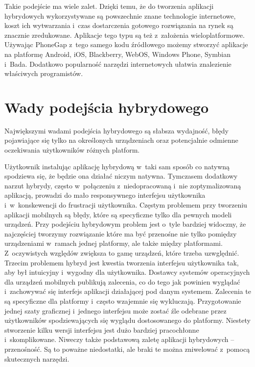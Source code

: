 \documentclass[brudnopis]{xmgr}
\begin{document}
Takie podejście ma wiele zalet. Dzięki temu, że do tworzenia aplikacji hybrydowych wykorzystywane są powszechnie znane technologie internetowe, koszt ich wytwarzania i~czas dostarczenia
gotowego rozwiązania na rynek są znacznie zredukowane. Aplikacje tego typu są też
z~założenia wieloplatformowe. Używając PhoneGap z~tego samego kodu źródłowego
możemy stworzyć aplikacje na platformę Android, iOS, Blackberry, WebOS,
Windows Phone, Symbian i~Bada. Dodatkowo popularność narzędzi internetowych
ułatwia znalezienie właściwych programistów.

\section{Wady podejścia hybrydowego}
Największymi wadami podejścia hybrydowego są słabsza wydajność, błędy
pojawiające się tylko na określonych urządzeniach oraz potencjalnie odmienne oczekiwania użytkowników różnych platform. 

Użytkownik instalując aplikację hybrydową w~taki sam sposób co 
natywną spodziewa się, że będzie ona działać niczym natywna. Tymczasem
dodatkowy narzut hybrydy, często w~połączeniu z~niedopracowaną i~nie
zoptymalizowaną aplikacją, prowadzi do mało responsywnego interfejsu
użytkownika i~w~konskewencji do frustracji użytkownika. Częstym problemem przy
tworzeniu aplikacji mobilnych są błędy, które są specyficzne tylko dla pewnych modeli urządzeń. Przy podejściu hybrydowym problem jest o~tyle bardziej widoczny, że
najczęściej tworzymy rozwiązanie które ma być przenośne nie tylko pomiędzy urządzeniami w~ramach jednej platformy, ale także między platformami. Z~oczywistych względów zwiększa to gamę urządzeń, które trzeba uzwględnić. Trzecim problemem hybryd jest kwestia
tworzenia interfejsu użytkownika tak, aby był intuicyjny i~wygodny dla użytkownika. Dostawcy systemów operacyjnych dla urządzeń
mobilnych publikują zalecenia, co do tego jak powinien wyglądać i~zachowywać się interfejs aplikacji
działającej pod danym systemem. Zalecenia te są specyficzne dla platformy i~często
wzajemnie się wykluczają. Przygotowanie jednej szaty graficznej i~jednego interfejsu
może zostać źle odebrane przez użytkowników spodziewających się wyglądu
dostosowanego do platformy. Niestety stworzenie kilku wersji interfejsu jest dużo
bardziej pracochłonne i~skomplikowane. Niweczy także podstawową zaletę aplikacji
hybrydowych – przenośność. 
Są to poważne niedostatki, ale braki te można zniwelować z~pomocą skutecznych narzędzi.
\end{document}
